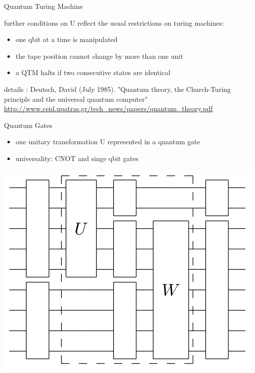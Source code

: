 \documentclass[c]{beamer}
\begin{document}
\begin{frame}{Quantum Turing Machine}

further conditions on U reflect the usual restrictions on turing machines: 
\begin{itemize}
\item one qbit at a time is manipulated
\item the tape position cannot change by more than one unit
\item a QTM halts if two consecutive states are identical 
\end{itemize}
\medskip
\begin{footnotesize}
details : Deutsch, David (July 1985). "Quantum theory, the Church-Turing principle and the universal quantum computer"
\url{http://www.ceid.upatras.gr/tech_news/papers/quantum_theory.pdf}
\end{footnotesize}

\end{frame}

\begin{frame}{Quantum Gates}
\begin{itemize}
\item one unitary transformation U represented in a quantum gate
\item universality: CNOT and singe qbit gates
\end{itemize}
\begin{center}
\includegraphics[scale=0.3]{images/circuit.png} 
\end{center}

\end{frame}
\end{document}

